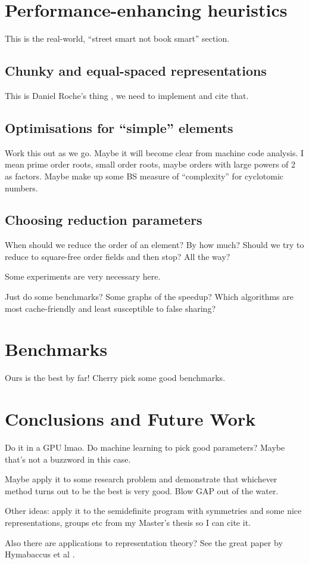 \documentclass{article}
\begin{document}
\section{Performance-enhancing heuristics}

This is the real-world, ``street smart not book smart'' section.

\subsection{Chunky and equal-spaced representations}

This is Daniel Roche's thing \cite{Roche2018}, we need to implement
and cite that.

\subsection{Optimisations for ``simple'' elements}

Work this out as we go. Maybe it will become clear from machine code
analysis. I mean prime order roots, small order roots, maybe orders
with large powers of 2 as factors. Maybe make up some BS measure of
``complexity'' for cyclotomic numbers.

\subsection{Choosing reduction parameters}

When should we reduce the order of an element? By how much? Should we
try to reduce to square-free order fields and then stop? All the way?

Some experiments are very necessary here.

Just do some benchmarks? Some graphs of the speedup? Which algorithms
are most cache-friendly and least susceptible to false sharing?

\section{Benchmarks}

Ours is the best by far! Cherry pick some good benchmarks.

\section{Conclusions and Future Work}

Do it in a GPU lmao. Do machine learning to pick good parameters?
Maybe that's not a buzzword in this case.

Maybe apply it to some research problem and demonstrate that whichever
method turns out to be the best is very good. Blow GAP out of the
water.

Other ideas: apply it to the semidefinite program with symmetries and
some nice representations, groups etc from my Master's thesis so I can
cite it.

Also there are applications to representation theory? See the great
paper by Hymabaccus et al \cite{Hymabaccus2020}.



\end{document}
